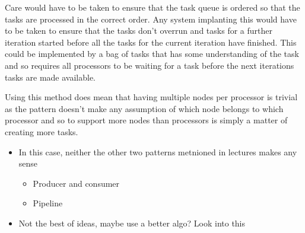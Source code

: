 Care would have to be taken to ensure that the task queue is ordered so
that the tasks are processed in the correct order. Any system implanting
this would have to be taken to ensure that the tasks don't overrun and
tasks for a further iteration started before all the tasks for the
current iteration have finished. This could be implemented by a bag of
tasks that has some understanding of the task and so requires all
processors to be waiting for a task before the next iterations tasks are
made available.

Using this method does mean that having multiple nodes per processor is
trivial as the pattern doesn't make any assumption of which node belongs
to which processor and so to support more nodes than processors is
simply a matter of creating more tasks.

\begin{itemize}
\itemsep1pt\parskip0pt
\item
  In this case, neither the other two patterns metnioned in lectures
  makes any sense

  \begin{itemize}
  \itemsep1pt\parskip0pt
  \item
    Producer and consumer
  \item
    Pipeline
  \end{itemize}
\item
  Not the best of ideas, maybe use a better algo? Look into this
\end{itemize}
